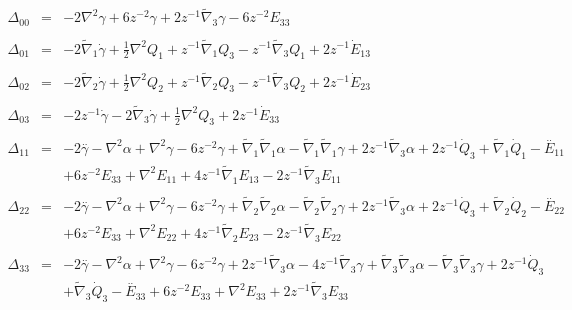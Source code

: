 \documentclass[10pt,letterpaper]{article}
\numberwithin{equation}{section}
\begin{document}
\begin{eqnarray}
\Delta_{00}&=& -2 \nabla^{2}{}\gamma + 6 z^{-2} \gamma + 2 z^{-1} \tilde{\nabla}_{3}\gamma -6 z^{-2} E_{33}
\\  \nonumber\\ 
\Delta_{01}&=& -2 \tilde{\nabla}_{1}\dot{\gamma}+\tfrac{1}{2} \nabla^{2}{}Q_{1} + z^{-1} \tilde{\nabla}_{1}Q_{3} -  z^{-1} \tilde{\nabla}_{3}Q_{1}+2 z^{-1} \dot{E}_{13}
\\  \nonumber\\ 
\Delta_{02}&=& -2 \tilde{\nabla}_{2}\dot{\gamma}+\tfrac{1}{2} \nabla^{2}{}Q_{2} + z^{-1} \tilde{\nabla}_{2}Q_{3} -  z^{-1} \tilde{\nabla}_{3}Q_{2}+2 z^{-1} \dot{E}_{23}
\\  \nonumber\\ 
\Delta_{03}&=& -2 z^{-1} \dot{\gamma} - 2 \tilde{\nabla}_{3}\dot{\gamma}+\tfrac{1}{2} \nabla^{2}{}Q_{3}+2 z^{-1} \dot{E}_{33}
\\  \nonumber\\ 
\Delta_{11}&=& -2 \overset{..}{\gamma} -  \nabla^{2}{}\alpha + \nabla^{2}{}\gamma - 6 z^{-2} \gamma + \tilde{\nabla}_{1}\tilde{\nabla}_{1}\alpha -  \tilde{\nabla}_{1}\tilde{\nabla}_{1}\gamma + 2 z^{-1} \tilde{\nabla}_{3}\alpha +2 z^{-1} \dot{Q}_{3} + \tilde{\nabla}_{1}\dot{Q}_{1}- \overset{..}{E}_{11} \nonumber \\ 
&& + 6 z^{-2} E_{33} + \nabla^{2}{}E_{11} + 4 z^{-1} \tilde{\nabla}_{1}E_{13} - 2 z^{-1} \tilde{\nabla}_{3}E_{11}
\\  \nonumber\\ 
\Delta_{22}&=& -2 \overset{..}{\gamma} -  \nabla^{2}{}\alpha + \nabla^{2}{}\gamma - 6 z^{-2} \gamma + \tilde{\nabla}_{2}\tilde{\nabla}_{2}\alpha -  \tilde{\nabla}_{2}\tilde{\nabla}_{2}\gamma + 2 z^{-1} \tilde{\nabla}_{3}\alpha +2 z^{-1} \dot{Q}_{3} + \tilde{\nabla}_{2}\dot{Q}_{2}- \overset{..}{E}_{22} \nonumber \\ 
&& + 6 z^{-2} E_{33} + \nabla^{2}{}E_{22} + 4 z^{-1} \tilde{\nabla}_{2}E_{23} - 2 z^{-1} \tilde{\nabla}_{3}E_{22}
\\  \nonumber\\ 
\Delta_{33}&=& -2 \overset{..}{\gamma} -  \nabla^{2}{}\alpha + \nabla^{2}{}\gamma - 6 z^{-2} \gamma + 2 z^{-1} \tilde{\nabla}_{3}\alpha - 4 z^{-1} \tilde{\nabla}_{3}\gamma + \tilde{\nabla}_{3}\tilde{\nabla}_{3}\alpha -  \tilde{\nabla}_{3}\tilde{\nabla}_{3}\gamma +2 z^{-1} \dot{Q}_{3} \nonumber \\ 
&& + \tilde{\nabla}_{3}\dot{Q}_{3}- \overset{..}{E}_{33} + 6 z^{-2} E_{33} + \nabla^{2}{}E_{33} + 2 z^{-1} \tilde{\nabla}_{3}E_{33}

\end{eqnarray}
\end{document}
